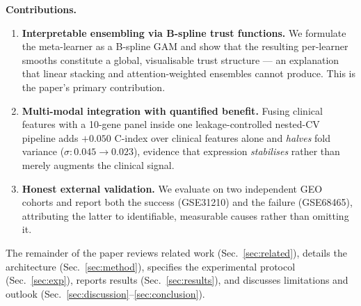\documentclass[journal]{IEEEtran}
\begin{document}
\noindent\textbf{Contributions.}
\begin{enumerate}
  \item \textbf{Interpretable ensembling via B-spline trust functions.}
  We formulate the meta-learner as a B-spline GAM and show that the resulting
  per-learner smooths constitute a global, visualisable trust structure ---
  an explanation that linear stacking and attention-weighted ensembles cannot
  produce. This is the paper's primary contribution.

  \item \textbf{Multi-modal integration with quantified benefit.}
  Fusing clinical features with a 10-gene panel inside one leakage-controlled
  nested-CV pipeline adds $+0.050$ C-index over clinical features alone and
  \emph{halves} fold variance ($\sigma\!:\!0.045\!\to\!0.023$), evidence that
  expression \emph{stabilises} rather than merely augments the clinical signal.

  \item \textbf{Honest external validation.}
  We evaluate on two independent GEO cohorts and report both the success
  (GSE31210) and the failure (GSE68465), attributing the latter to
  identifiable, measurable causes rather than omitting it.
\end{enumerate}

The remainder of the paper reviews related work
(Sec.~\ref{sec:related}), details the architecture (Sec.~\ref{sec:method}),
specifies the experimental protocol (Sec.~\ref{sec:exp}), reports results
(Sec.~\ref{sec:results}), and discusses limitations and outlook
(Sec.~\ref{sec:discussion}--\ref{sec:conclusion}).
\end{document}
